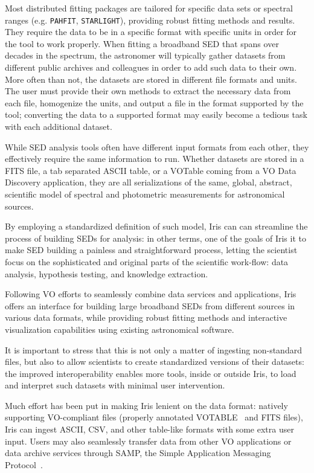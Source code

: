 \documentclass[final,5p,authoryear]{elsarticle}
\begin{document}
Most distributed fitting packages are tailored for specific data sets or
spectral ranges (e.g. \texttt{PAHFIT}, \texttt{STAR\-LIGHT}), providing robust
fitting methods and results. They require the data to be in a specific format
with specific units in order for the tool to work properly. When fitting a
broadband SED that spans over decades in the spectrum, the astronomer will
typically gather datasets from different public archives and colleagues in order
to add such data to their own. More often than not, the datasets are stored in
different file formats and units. 
The user must provide their own methods to extract the necessary data from each
file, homogenize the units, and output a file in the format supported by the
tool; converting the data to a supported format may easily become a tedious task
with each additional dataset.

While SED analysis tools often have different input formats from each other,
they effectively require the same information to run. Whether datasets are
stored in a FITS file, a tab separated ASCII table, or a VOTable coming from a
VO Data Discovery application, they are all serializations of the same, global,
abstract, scientific model of spectral and photometric measurements for
astronomical sources.

By employing a standardized definition of such model, Iris can can streamline
the process of building SEDs for analysis: in other terms, one of the goals of
Iris it to make SED building a painless and straightforward process, letting the
scientist focus on the sophisticated and original parts of the scientific
work-flow: data analysis, hypothesis testing, and knowledge extraction.

Following VO efforts to seamlessly combine data services and applications, Iris
offers an interface for building large broadband SEDs from different sources in
various data formats, while providing robust fitting methods and interactive
visualization capabilities using existing astronomical software.

It is important to stress that this is not only a matter of ingesting
non-standard files, but also to allow scientists to create standardized versions
of their datasets: the improved interoperability enables more tools, inside or
outside Iris, to load and interpret such datasets with minimal user
intervention.

Much effort has been put in making Iris lenient on the data format: natively
supporting VO-compliant files (properly annotated
VOTABLE~\citep{2011arXiv1110.0524O} and FITS files), Iris can ingest ASCII, CSV,
and other table-like formats with some extra user input. Users may also
seamlessly transfer data from other VO applications or data archive services
through SAMP, the Simple Application Messaging
Protocol~\citep{2011arXiv1110.0528T}.
\end{document}
